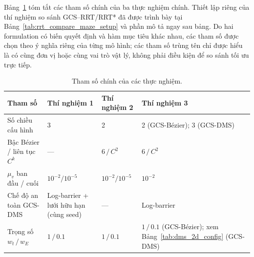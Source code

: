 Bảng~\ref{tab:exp_params} tóm tắt các tham số chính của ba thực nghiệm chính.
Thiết lập riêng của thí nghiệm so sánh GCS--RRT/RRT* đã được trình bày tại
Bảng~\ref{tab:rrt_compare_maze_setup} và phần mô tả ngay sau bảng. Do hai
formulation có biến quyết định và hàm mục tiêu khác nhau, các tham số được chọn
theo ý nghĩa riêng của từng mô hình; các tham số trùng tên chỉ được hiểu là có
cùng đơn vị hoặc cùng vai trò vật lý, không phải điều kiện để so sánh tối ưu
trực tiếp.

\begin{table}[!htp]
    \centering
    \caption{Tham số chính của các thực nghiệm.}
    \label{tab:exp_params}
    \renewcommand{\arraystretch}{1.4}
    {\footnotesize
        \begin{tabular}{@{}p{3cm}p{3.8cm}p{2.6cm}p{4.6cm}@{}}
            \toprule
            \textbf{Tham số}
             & {\tiny\textbf{Thí nghiệm 1}}
             & {\tiny\textbf{Thí nghiệm 2}}
             & {\tiny\textbf{Thí nghiệm 3}}                                                                                                                \\
            \midrule
            Số chiều cấu hình
             & 3                                                                      & 2                   & 2 (GCS-Bézier); 3 (GCS-DMS)   \\
            \addlinespace[3pt]
            Bậc Bézier / liên tục $C^k$
             & ---                                                                    & $6 \,/\, C^2$       & $6 \,/\, C^2$                 \\
            \addlinespace[3pt]
            $\mu_v$ ban đầu / cuối
             & $10^{-2} / 10^{-5}$                                                    & $10^{-2} / 10^{-5}$ & $10^{-2}$                     \\
            \addlinespace[3pt]
            Chế độ an toàn GCS-DMS
             & Log-barrier + lưới hữu hạn (cùng seed)                                 & ---                 & Log-barrier                   \\
            \addlinespace[3pt]
            Trọng số $w_t \,/\, w_E$
             & $1 \,/\, 0.1$                                                          & $1 \,/\, 0.1$
             & $1 \,/\, 0.1$ (GCS-Bézier); xem Bảng~\ref{tab:dms_2d_config} (GCS-DMS)                                                       \\

\end{tabular}}
\end{table}
